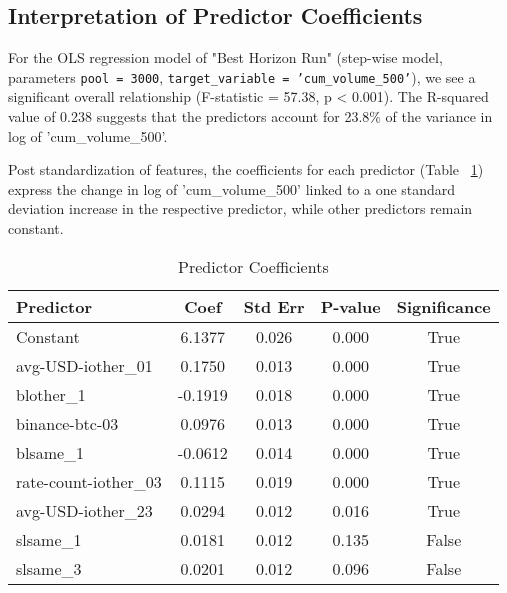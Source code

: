 \documentclass{article}
\begin{document}
\subsection{Interpretation of Predictor Coefficients}
For the OLS regression model of "Best Horizon Run" (step-wise model, parameters \texttt{pool = 3000}, \texttt{target\_variable = 'cum\_volume\_500'}), we see a significant overall relationship (F-statistic = 57.38, p \textless{} 0.001). The R-squared value of 0.238 suggests that the predictors account for 23.8\% of the variance in log of 'cum\_volume\_500'.

Post standardization of features, the coefficients for each predictor (Table ~\ref{tab:predictor-coefficients}) express the change in log of 'cum\_volume\_500' linked to a one standard deviation increase in the respective predictor, while other predictors remain constant.

\begin{table}[htbp]
  \centering
  \begin{tabular}{|l|c|c|c|c|}
  \hline
  \textbf{Predictor}        & \textbf{Coef} & \textbf{Std Err} & \textbf{P-value} & \textbf{Significance} \\
  \hline
  Constant                  & 6.1377        & 0.026            & 0.000            & True                  \\
  avg-USD-iother\_01       & 0.1750        & 0.013            & 0.000            & True                  \\
  blother\_1               & -0.1919       & 0.018            & 0.000            & True                  \\
  binance-btc-03          & 0.0976        & 0.013            & 0.000            & True                  \\
  blsame\_1                & -0.0612       & 0.014            & 0.000            & True                  \\
  rate-count-iother\_03    & 0.1115        & 0.019            & 0.000            & True                  \\
  avg-USD-iother\_23       & 0.0294        & 0.012            & 0.016            & True                  \\
  slsame\_1                & 0.0181        & 0.012            & 0.135            & False                 \\
  slsame\_3                & 0.0201        & 0.012            & 0.096            & False                 \\
  \hline
  \end{tabular}
  \caption{Predictor Coefficients}
  \label{tab:predictor-coefficients}
\end{table}
\end{document}
